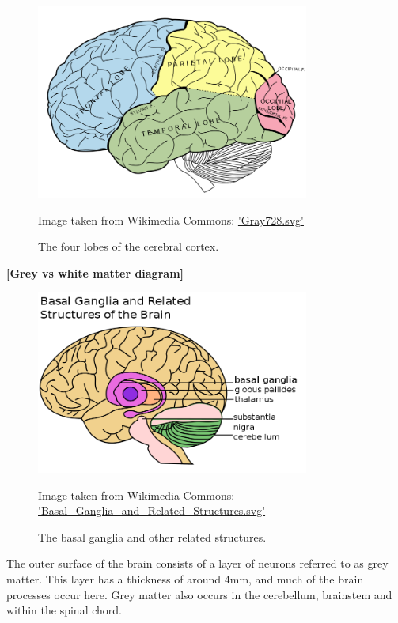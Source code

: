 \documentclass[honours,12pt]{unswthesis}
\numberwithin{equation}{section}
\begin{document}
\begin{figure}[ht]
	\centering
	\includegraphics[width=0.8\textwidth]{Images/2_Lobes_of_the_brain_NL.png}
	\caption{The four lobes of the cerebral cortex.}
	\small Image taken from Wikimedia Commons: \url{'Gray728.svg'}
\end{figure}

\textbf{[Grey vs white matter diagram]}

\begin{figure}[ht]
	\centering
	\includegraphics[width=0.8\textwidth]{Images/2_Basal_Ganglia_and_Related_Structures.png}
	\caption{The basal ganglia and other related structures.}
	\small Image taken from Wikimedia Commons: \url{'Basal_Ganglia_and_Related_Structures.svg'}
\end{figure}


The outer surface of the brain consists of a layer of neurons referred to as grey matter. This layer has a thickness of around 4mm, and much of the brain processes occur here. Grey matter also occurs in the cerebellum, brainstem and within the spinal chord.
\end{document}
